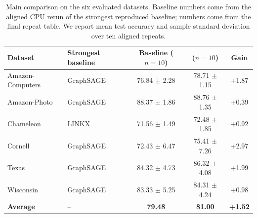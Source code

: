 \begin{table}[t]
\centering
\small
\caption{Main comparison on the six evaluated datasets. Baseline numbers come from the aligned CPU rerun of the strongest reproduced baseline; \SRC{} numbers come from the final \SRC{} repeat table. We report mean test accuracy and sample standard deviation over ten aligned repeats.}
\label{tab:main-results}
\begin{tabular}{llccc}
\toprule
Dataset & Strongest baseline & Baseline ($n=10$) & \SRC{} ($n=10$) & Gain \\
\midrule
Amazon-Computers & GraphSAGE & 76.84 $\pm$ 2.28 & 78.71 $\pm$ 1.15 & +1.87 \\
Amazon-Photo & GraphSAGE & 88.37 $\pm$ 1.86 & 88.76 $\pm$ 1.35 & +0.39 \\
Chameleon & LINKX & 71.56 $\pm$ 1.49 & 72.48 $\pm$ 1.85 & +0.92 \\
Cornell & GraphSAGE & 72.43 $\pm$ 6.47 & 75.41 $\pm$ 7.26 & +2.97 \\
Texas & GraphSAGE & 84.32 $\pm$ 4.73 & 86.32 $\pm$ 4.08 & +1.99 \\
Wisconsin & GraphSAGE & 83.33 $\pm$ 5.25 & 84.31 $\pm$ 4.24 & +0.98 \\
\midrule
\textbf{Average} & -- & \textbf{79.48} & \textbf{81.00} & \textbf{+1.52} \\
\bottomrule
\end{tabular}
\end{table}
